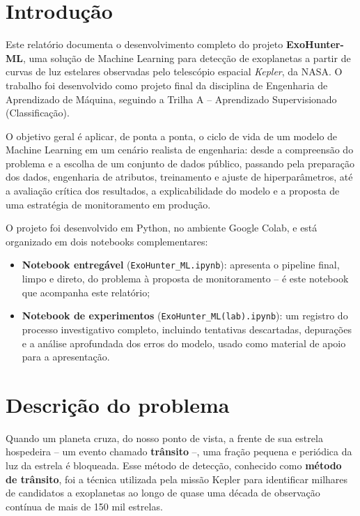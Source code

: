 \documentclass[12pt,a4paper]{article}
\begin{document}
\tableofcontents
\newpage


\section{Introdução}

Este relatório documenta o desenvolvimento completo do projeto \textbf{ExoHunter-ML}, uma solução de Machine Learning para detecção de exoplanetas a partir de curvas de luz estelares observadas pelo telescópio espacial \textit{Kepler}, da NASA. O trabalho foi desenvolvido como projeto final da disciplina de Engenharia de Aprendizado de Máquina, seguindo a Trilha A -- Aprendizado Supervisionado (Classificação).

O objetivo geral é aplicar, de ponta a ponta, o ciclo de vida de um modelo de Machine Learning em um cenário realista de engenharia: desde a compreensão do problema e a escolha de um conjunto de dados público, passando pela preparação dos dados, engenharia de atributos, treinamento e ajuste de hiperparâmetros, até a avaliação crítica dos resultados, a explicabilidade do modelo e a proposta de uma estratégia de monitoramento em produção.

O projeto foi desenvolvido em Python, no ambiente Google Colab, e está organizado em dois notebooks complementares:

\begin{itemize}[leftmargin=1.5cm]
    \item \textbf{Notebook entregável} (\texttt{ExoHunter\_ML.ipynb}): apresenta o pipeline final, limpo e direto, do problema à proposta de monitoramento -- é este notebook que acompanha este relatório;
    \item \textbf{Notebook de experimentos} (\texttt{ExoHunter\_ML(lab).ipynb}): um registro do processo investigativo completo, incluindo tentativas descartadas, depurações e a análise aprofundada dos erros do modelo, usado como material de apoio para a apresentação.
\end{itemize}


\section{Descrição do problema}

Quando um planeta cruza, do nosso ponto de vista, a frente de sua estrela hospedeira -- um evento chamado \textbf{trânsito} --, uma fração pequena e periódica da luz da estrela é bloqueada. Esse método de detecção, conhecido como \textbf{método de trânsito}, foi a técnica utilizada pela missão Kepler para identificar milhares de candidatos a exoplanetas ao longo de quase uma década de observação contínua de mais de 150 mil estrelas.
\end{document}
